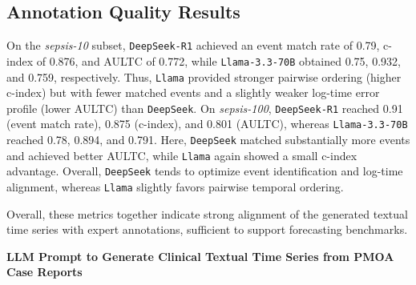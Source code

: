 \subsection*{Annotation Quality Results}
On the \textit{sepsis-10} subset, \texttt{DeepSeek-R1} achieved an event match rate of 0.79, c-index of 0.876, and AULTC of 0.772, while \texttt{Llama-3.3-70B} obtained 0.75, 0.932, and 0.759, respectively. Thus, \texttt{Llama} provided stronger pairwise ordering (higher c-index) but with fewer matched events and a slightly weaker log-time error profile (lower AULTC) than \texttt{DeepSeek}. On \textit{sepsis-100}, \texttt{DeepSeek-R1} reached 0.91 (event match rate), 0.875 (c-index), and 0.801 (AULTC), whereas \texttt{Llama-3.3-70B} reached 0.78, 0.894, and 0.791. Here, \texttt{DeepSeek} matched substantially more events and achieved better AULTC, while \texttt{Llama} again showed a small c-index advantage. Overall, \texttt{DeepSeek} tends to optimize event identification and log-time alignment, whereas \texttt{Llama} slightly favors pairwise temporal ordering. 

Overall, these metrics together indicate strong alignment of the generated textual time series with expert annotations, sufficient to support forecasting benchmarks. 


\onecolumn

{ \label{TTS_prompt}
\Large\bfseries\thesection\quad LLM Prompt to Generate Clinical Textual Time Series from PMOA Case Reports
}

\vspace{1em}

